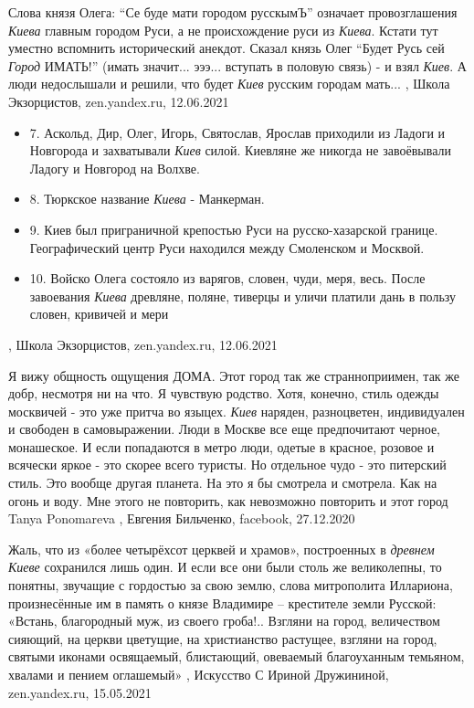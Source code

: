 Слова князя Олега: \enquote{Се буде мати городом русскымЪ} означает провозглашения
\emph{Киева} главным городом Руси, а не происхождение руси из \emph{Киева}. Кстати тут
уместно вспомнить исторический анекдот. Сказал князь Олег \enquote{Будет Русь сей \emph{Город}
ИМАТЬ!} (имать значит... эээ... вступать в половую связь) - и взял \emph{Киев}. А люди
недослышали и решили, что будет \emph{Киев} русским городам мать... 
, 
Школа Экзорцистов, zen.yandex.ru, 12.06.2021

\begin{itemize}
  \item 7. Аскольд, Дир, Олег, Игорь, Святослав, Ярослав приходили из Ладоги и
  Новгорода и захватывали \emph{Киев} силой. Киевляне же никогда не завоёвывали Ладогу
  и Новгород на Волхве.
  \item 8. Тюркское название \emph{Киева} - Манкерман.
  \item 9. Киев был приграничной крепостью Руси на русско-хазарской границе. Географический центр Руси находился между Смоленском и Москвой.
  \item 10. Войско Олега состояло из варягов, словен, чуди, меря, весь. После
  завоевания \emph{Киева} древляне, поляне, тиверцы и уличи платили дань в пользу
  словен, кривичей и мери
\end{itemize}
, 
Школа Экзорцистов, zen.yandex.ru, 12.06.2021

Я вижу общность ощущения ДОМА. Этот город так же странноприимен, так же добр,
несмотря ни на что. Я чувствую родство. Хотя, конечно, стиль одежды москвичей -
это уже притча во языцех. \emph{Киев} наряден, разноцветен, индивидуален и свободен в
самовыражении. Люди в Москве все еще предпочитают черное, монашеское. И если
попадаются в метро люди, одетые в красное, розовое и всячески яркое - это
скорее всего туристы. Но отдельное чудо - это питерский стиль. Это вообще
другая планета. На это я бы смотрела и смотрела. Как на огонь и воду. Мне этого
не повторить, как невозможно повторить и этот город
Tanya Ponomareva
, 
Евгения Бильченко, facebook, 27.12.2020

Жаль, что из «более четырёхсот церквей и храмов», построенных в \emph{древнем Киеве}
сохранился лишь один. И если все они были столь же великолепны, то понятны,
звучащие с гордостью за свою землю, слова митрополита Иллариона, произнесённые
им в память о князе Владимире – крестителе земли Русской: «Встань, благородный
муж, из своего гроба!.. Взгляни на город, величеством сияющий, на церкви
цветущие, на христианство растущее, взгляни на город, святыми иконами
освящаемый, блистающий, овеваемый благоуханным темьяном, хвалами и пением
оглашемый»
, 
Искусство С Ириной Дружининой, zen.yandex.ru, 15.05.2021

